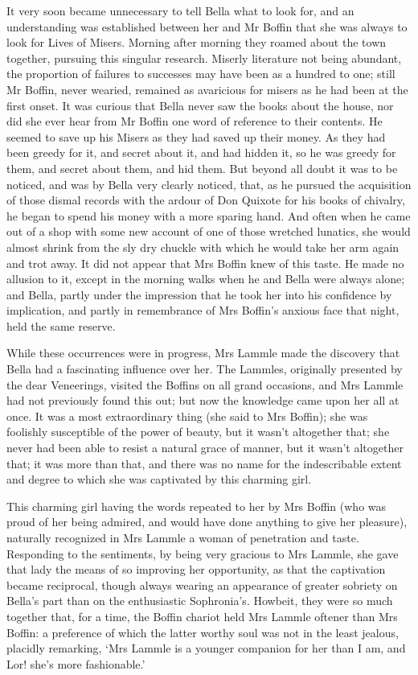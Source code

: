 It very soon became unnecessary to tell Bella what to look for, and an
understanding was established between her and Mr Boffin that she was
always to look for Lives of Misers. Morning after morning they roamed
about the town together, pursuing this singular research. Miserly
literature not being abundant, the proportion of failures to successes
may have been as a hundred to one; still Mr Boffin, never wearied,
remained as avaricious for misers as he had been at the first onset. It
was curious that Bella never saw the books about the house, nor did she
ever hear from Mr Boffin one word of reference to their contents. He
seemed to save up his Misers as they had saved up their money. As they
had been greedy for it, and secret about it, and had hidden it, so he
was greedy for them, and secret about them, and hid them. But beyond all
doubt it was to be noticed, and was by Bella very clearly noticed, that,
as he pursued the acquisition of those dismal records with the ardour of
Don Quixote for his books of chivalry, he began to spend his money with
a more sparing hand. And often when he came out of a shop with some new
account of one of those wretched lunatics, she would almost shrink from
the sly dry chuckle with which he would take her arm again and trot
away. It did not appear that Mrs Boffin knew of this taste. He made
no allusion to it, except in the morning walks when he and Bella were
always alone; and Bella, partly under the impression that he took her
into his confidence by implication, and partly in remembrance of Mrs
Boffin’s anxious face that night, held the same reserve.

While these occurrences were in progress, Mrs Lammle made the discovery
that Bella had a fascinating influence over her. The Lammles, originally
presented by the dear Veneerings, visited the Boffins on all grand
occasions, and Mrs Lammle had not previously found this out; but now the
knowledge came upon her all at once. It was a most extraordinary thing
(she said to Mrs Boffin); she was foolishly susceptible of the power of
beauty, but it wasn’t altogether that; she never had been able to resist
a natural grace of manner, but it wasn’t altogether that; it was more
than that, and there was no name for the indescribable extent and degree
to which she was captivated by this charming girl.

This charming girl having the words repeated to her by Mrs Boffin (who
was proud of her being admired, and would have done anything to give her
pleasure), naturally recognized in Mrs Lammle a woman of penetration
and taste. Responding to the sentiments, by being very gracious to Mrs
Lammle, she gave that lady the means of so improving her opportunity,
as that the captivation became reciprocal, though always wearing an
appearance of greater sobriety on Bella’s part than on the enthusiastic
Sophronia’s. Howbeit, they were so much together that, for a time, the
Boffin chariot held Mrs Lammle oftener than Mrs Boffin: a preference
of which the latter worthy soul was not in the least jealous, placidly
remarking, ‘Mrs Lammle is a younger companion for her than I am, and
Lor! she’s more fashionable.’

